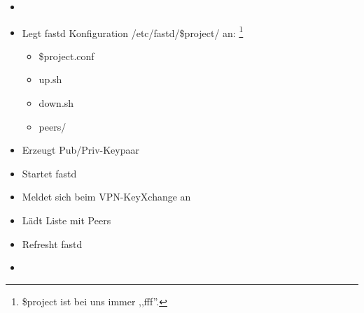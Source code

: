 \begin{frame}{}
    \begin{itemize}
        \item {}
        \item Legt fastd Konfiguration
            /etc/fastd/\$project/  an:
            \footnote{\$project ist bei uns immer ,,fff''.}
            \begin{itemize}
                \item \$project.conf
                \item up.sh
                \item down.sh
                \item peers/
            \end{itemize}
        \item Erzeugt Pub/Priv-Keypaar
        \item Startet fastd
        \item Meldet sich beim VPN-KeyXchange an
        \item Lädt Liste mit Peers
        \item Refresht fastd
        \item {}
    \end{itemize}
\end{frame}

